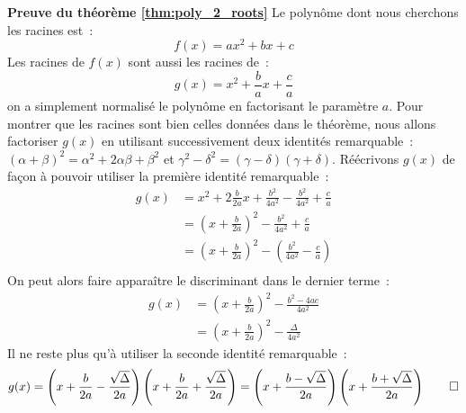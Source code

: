 \documentclass[10pt,notheorems]{beamer}
\theoremstyle{plain}
\theoremstyle{definition} %
\begin{document}
\begin{notes}
  \textbf{Preuve du théorème \hyperlink{slide_polynome_2_racines_5}{\ref{thm:poly_2_roots}}} Le polynôme dont nous cherchons les racines est~:
  \[
    f(x) = a x^2 + b x + c
  \]
  Les racines de $f(x)$ sont aussi les racines de~:
  \[
    g(x) = x^2 +\frac{b}{a} x + \frac{c}{a}
  \]
  on a simplement normalisé le polynôme en factorisant le paramètre $a$. Pour montrer que les racines sont bien celles données dans le théorème, nous allons factoriser $g(x)$ en utilisant successivement deux identités remarquable~: $(\alpha+\beta)^2=\alpha^2+2\alpha\beta+\beta^2$ et $\gamma^2-\delta^2 = (\gamma-\delta)(\gamma+\delta)$. Réécrivons $g(x)$ de façon à pouvoir utiliser la première identité remarquable~:
  \[
    \begin{split}
      g(x) &= x^2 + 2\frac{b}{2a} x +  \frac{b^2}{4a^2} - \frac{b^2}{4a^2} + \frac{c}{a}\\
      &= \left(x+\frac{b}{2a}\right)^2- \frac{b^2}{4a^2} + \frac{c}{a}\\
      &= \left(x+\frac{b}{2a}\right)^2- \left(\frac{b^2}{4a^2} - \frac{c}{a}\right)\\
    \end{split}
  \]
  On peut alors faire apparaître le discriminant dans le dernier terme~:
  \[
    \begin{split}
      g(x) &= \left(x+\frac{b}{2a}\right)^2- \frac{b^2-4ac}{4a^2}\\
      &= \left(x+\frac{b}{2a}\right)^2- \frac{\Delta}{4a^2}
    \end{split}
  \]
  Il ne reste plus qu'à utiliser la seconde identité remarquable~:
  \[
    g(x) = \left(x+\frac{b}{2a}-\frac{\sqrt{\Delta}}{2a}\right)\left(x+\frac{b}{2a}+\frac{\sqrt{\Delta}}{2a}\right) = \left(x+\frac{b-\sqrt{\Delta}}{2a}\right)\left(x+\frac{b+\sqrt{\Delta}}{2a}\right)\qed
  \]

\end{notes}
\end{document}
